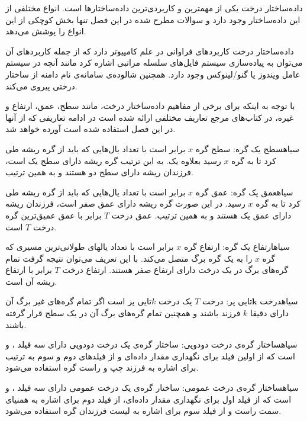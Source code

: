 

داده‌ساختار درخت یکی از مهمترین و کاربردی‌ترین داده‌ساختارها است. انواع مختلفی از این داده‌ساختار وجود دارد و سوالات مطرح شده در این فصل تنها بخش کوچکی از این انواع را پوشش می‌دهد. 

داده‌ساختار درخت کاربردهای فراوانی در علم کامپیوتر دارد که از جمله کاربردهای آن می‌توان به پیاده‌سازی سیستم فایل‌های سلسله مراتبی اشاره کرد مانند آنچه در سیستم عامل ویندوز یا گنو/لینوکس وجود دارد. همچنین شالوده‌ی سامانه‌ی نام دامنه از ساختار درختی پیروی می‌کند.

با توجه به اینکه برای برخی از مفاهیم داده‌ساختار درخت، مانند سطح، عمق، ارتفاع و غیره، در کتاب‌های مرجع تعاریف مختلفی ارائه شده است در ادامه تعاریفی که از آنها در این فصل استفاده شده است آورده خواهد شد.

‌سیاه{سطح یک گره}: سطح گره {$x$} برابر است با تعداد یال‌هایی که باید از گره ریشه طی کرد تا به گره {$x$} رسید بعلاوه یک. به این ترتیب گره ریشه دارای سطح یک است، فرزندان ریشه دارای سطح دو هستند و به همین ترتیب.

‌سیاه{عمق یک گره}: عمق گره {$x$} برابر است با تعداد یال‌هایی که باید از گره ریشه طی کرد تا به گره {$x$} رسید. در این صورت گره ریشه دارای عمق صفر است، فرزندان ریشه دارای عمق یک هستند و به همین ترتیب. عمق درخت {$T$} برابر با عمق عمیق‌ترین گره درخت {$T$} است.

‌سیاه{ارتفاع یک گره}: ارتفاع گره {$x$} برابر است با تعداد یالهای طولانی‌ترین مسیری که گره {$x$} را به یک گره برگ متصل می‌کند. با این تعریف می‌توان نتیجه گرفت تمام گره‌های برگ در یک درخت دارای ارتفاع صفر هستند. ارتفاع درخت {$T$} برابر با ارتفاع ریشه آن است.

‌سیاه{درخت {$\mathbf{k}$}تایی پر}: درخت {$T$} یک درخت {$k$}تایی پر است اگر تمام گره‌های غیر برگ آن دارای دقیقا {$k$} فرزند باشند و همچنین تمام گره‌های برگ آن در یک سطح قرار گرفته باشند.

‌سیاه{ساختار گره‌ی درخت دودویی}: ساختار گره‌ی یک درخت دودویی دارای سه فیلد {}، {} و {} است که از اولین فیلد برای نگهداری مقدار داده‌ای و از فیلدهای دوم و سوم به ترتیب برای اشاره به فرزند چپ و راست گره استفاده می‌شود.

‌سیاه{ساختار گره‌ی درخت عمومی}: ساختار گره‌ی یک درخت عمومی دارای سه فیلد {}، {} و {} است که از فیلد اول برای نگهداری مقدار داده‌ای، از فیلد دوم برای اشاره به همنیای سمت راست و از فیلد سوم برای اشاره به لیست فرزندان گره استفاده می‌شود.

